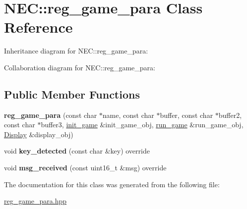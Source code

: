 \hypertarget{classNEC_1_1reg__game__para}{}\section{N\+EC\+:\+:reg\+\_\+game\+\_\+para Class Reference}
\label{classNEC_1_1reg__game__para}


Inheritance diagram for N\+EC\+:\+:reg\+\_\+game\+\_\+para\+:


Collaboration diagram for N\+EC\+:\+:reg\+\_\+game\+\_\+para\+:
\subsection*{Public Member Functions}
\begin{DoxyCompactItemize}
\item 
\mbox{\label{classNEC_1_1reg__game__para_a60dc5ea10c170a90eb232531217edfee}} 
{\bfseries reg\+\_\+game\+\_\+para} (const char $\ast$name, const char $\ast$buffer, const char $\ast$buffer2, const char $\ast$buffer3, \hyperlink{classNEC_1_1init__game}{init\+\_\+game} \&init\+\_\+game\+\_\+obj, \hyperlink{classNEC_1_1run__game}{run\+\_\+game} \&run\+\_\+game\+\_\+obj, \hyperlink{classNEC_1_1Display}{Display} \&display\+\_\+obj)
\item 
\mbox{\label{classNEC_1_1reg__game__para_aa7ac9168334a59a7497195ed358ce243}} 
void {\bfseries key\+\_\+detected} (const char \&key) override
\item 
\mbox{\label{classNEC_1_1reg__game__para_a58681d519f16d4c7a2260423edc6d388}} 
void {\bfseries msg\+\_\+received} (const uint16\+\_\+t \&msg) override
\end{DoxyCompactItemize}


The documentation for this class was generated from the following file\+:\begin{DoxyCompactItemize}
\item 
\hyperlink{reg__game__para_8hpp}{reg\+\_\+game\+\_\+para.\+hpp}\end{DoxyCompactItemize}
